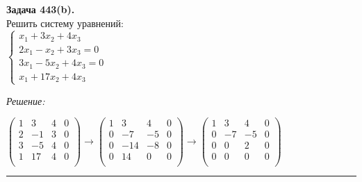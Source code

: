 \documentclass[a4paper, 12pt]{article}
\newenvironment{problem}[2][Задача]
    { \begin{mdframed}[backgroundcolor=gray!10] \textbf{#1 #2.} \\}
    {  \end{mdframed}}
\newenvironment{solution}
    {\textit{Решение: }}
    {\noindent\rule{7in}{1.5pt}}
\begin{document}
\begin{problem}{443(b)}
Решить систему уравнений:\\
$\left\{\begin{array}{l}
x_1+3x_2+4x_3\\
2x_1-x_2+3x_3=0\\
3x_1-5x_2+4x_3=0\\
x_1+17x_2+4x_3
\end{array}\right.$


\end{problem}
\begin{solution}

$
\left(
\begin{array}{rrrrrrrr}
1 &  3 & 4 & 0 \\
2 & -1 & 3 & 0 \\
3 & -5 & 4 & 0 \\
1 & 17 & 4 & 0 \\
\end{array}
\right)
\rightarrow
\left(
\begin{array}{rrrrrrrr}
1 &   3 &  4 & 0 \\
0 &  -7 & -5 & 0 \\
0 & -14 & -8 & 0 \\
0 &  14 &  0 & 0 \\
\end{array}
\right)
\rightarrow
\left(
\begin{array}{rrrrrrrr}
1 &  3 &  4 & 0 \\
0 & -7 & -5 & 0 \\
0 &  0 &  2 & 0 \\
0 &  0 &  0 & 0 \\
\end{array}
\right)
$

\end{solution}
\end{document}
